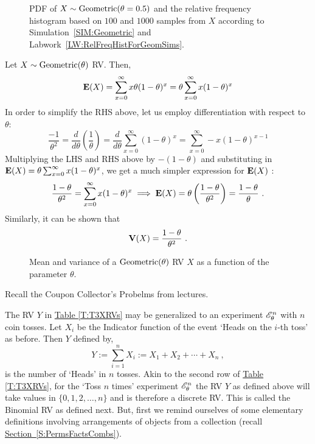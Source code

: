 \begin{figure}[htpb]
\caption{PDF of $X \sim \mbox{{\rm Geometric}}(\theta=0.5)$ and the relative frequency histogram based on $100$ and $1000$ samples from $X$ according to Simulation~\ref{SIM:Geometric} and Labwork~\ref{LW:RelFreqHistForGeomSims}.\label{F:PlotPdfSimHistGeomthetaHalf}}
\centering   {}
\end{figure}

\begin{example}
Let $X \sim \mbox{{\rm Geometric}}(\theta)$ RV.  Then,
\[
\mathbf{E}(X) = \sum_{x=0}^{\infty} x \theta(1-\theta)^x =  \theta \sum_{x=0}^{\infty} x (1-\theta)^x
\]
In order to simplify the RHS above, let us employ differentiation with respect to $\theta$:
\[
\frac{-1}{\theta^2}= \frac{d}{d\theta} \left( \frac{1}{\theta} \right)= \frac{d}{d\theta} \sum_{x=0}^{\infty} (1-\theta)^x  =  \sum_{x=0}^{\infty} -x (1-\theta)^{x-1}
\]
Multiplying the LHS and RHS above by $-(1-\theta)$ and substituting in $\mathbf{E}(X)=  \theta \sum_{x=0}^{\infty} x (1-\theta)^x$, we get a much simpler expression for $\mathbf{E}(X)$ :
\[
\frac{1-\theta}{\theta^2}= \sum_{x=0}^{\infty} x (1-\theta)^{x} \implies \mathbf{E}(X) = \theta \left( \frac{1-\theta}{\theta^2} \right) = \frac{1-\theta}{\theta} \ .
\]
Similarly, it can be shown that
\[
\mathbf{V}(X) = \frac{1-\theta}{\theta^2} \ .
\]

\begin{figure}[htpb]
\caption{Mean and variance of a $\mbox{{\rm Geometric}}(\theta)$ RV $X$ as a function of the parameter $\theta$.\label{F:MeanVarGeom}}
\centering   {}
\end{figure}
\end{example}

\begin{example}
Recall the Coupon Collector's Probelms from lectures.%
\vspace{5cm}
~ 
\end{example}

The RV $Y$ in \hyperref[T:T3XRVs]{Table \ref*{T:T3XRVs}} may be generalized to an experiment $\mathscr{E}_{\theta}^{n}$ with $n$ coin tosses.  
Let $X_i$ be the Indicator function of the event `Heads on the $i$-th toss' as before.  Then $Y$ defined by,
 \[
 Y := \sum_{i=1}^n X_i := X_1 + X_2 + \cdots + X_n  \ ,
 \]
is the number of `Heads' in $n$ tosses.  
Akin to the second row of \hyperref[T:T3XRVs]{Table \ref*{T:T3XRVs}}, for the `Toss $n$ times' experiment $\mathscr{E}_{\theta}^{n}$ the
RV $Y$ as defined above will take values in $\{0,1,2,\ldots,n\}$ and is therefore a discrete RV.  This is called the Binomial RV as defined next.  
But, first we remind ourselves of some elementary definitions involving arrangements of objects from a collection (recall \hyperref[S:PermsFactsCombs]{Section~\ref*{S:PermsFactsCombs}}).

